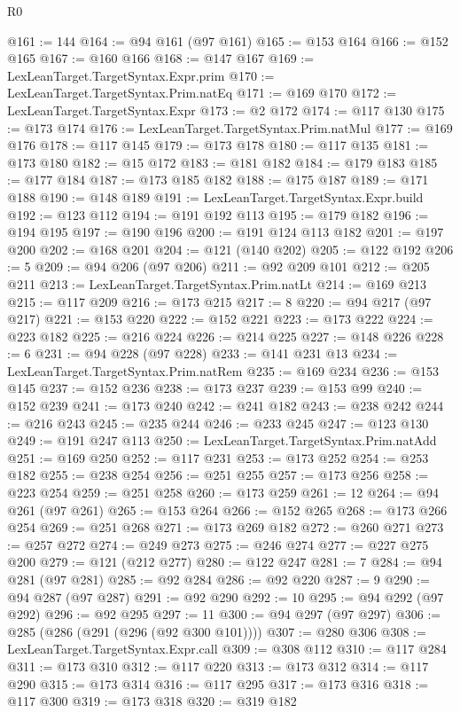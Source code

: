 \begin{lexlean}{R0}
\begin{coremodule}
@161 := 144
@164 := @94 @161 (@97 @161)
@165 := @153 @164
@166 := @152 @165
@167 := @160 @166
@168 := @147 @167
@169 := LexLeanTarget.TargetSyntax.Expr.prim
@170 := LexLeanTarget.TargetSyntax.Prim.natEq
@171 := @169 @170
@172 := LexLeanTarget.TargetSyntax.Expr
@173 := @2 @172
@174 := @117 @130
@175 := @173 @174
@176 := LexLeanTarget.TargetSyntax.Prim.natMul
@177 := @169 @176
@178 := @117 @145
@179 := @173 @178
@180 := @117 @135
@181 := @173 @180
@182 := @15 @172
@183 := @181 @182
@184 := @179 @183
@185 := @177 @184
@187 := @173 @185 @182
@188 := @175 @187
@189 := @171 @188
@190 := @148 @189
@191 := LexLeanTarget.TargetSyntax.Expr.build
@192 := @123 @112
@194 := @191 @192 @113
@195 := @179 @182
@196 := @194 @195
@197 := @190 @196
@200 := @191 @124 @113 @182
@201 := @197 @200
@202 := @168 @201
@204 := @121 (@140 @202)
@205 := @122 @192
@206 := 5
@209 := @94 @206 (@97 @206)
@211 := @92 @209 @101
@212 := @205 @211
@213 := LexLeanTarget.TargetSyntax.Prim.natLt
@214 := @169 @213
@215 := @117 @209
@216 := @173 @215
@217 := 8
@220 := @94 @217 (@97 @217)
@221 := @153 @220
@222 := @152 @221
@223 := @173 @222
@224 := @223 @182
@225 := @216 @224
@226 := @214 @225
@227 := @148 @226
@228 := 6
@231 := @94 @228 (@97 @228)
@233 := @141 @231 @13
@234 := LexLeanTarget.TargetSyntax.Prim.natRem
@235 := @169 @234
@236 := @153 @145
@237 := @152 @236
@238 := @173 @237
@239 := @153 @99
@240 := @152 @239
@241 := @173 @240
@242 := @241 @182
@243 := @238 @242
@244 := @216 @243
@245 := @235 @244
@246 := @233 @245
@247 := @123 @130
@249 := @191 @247 @113
@250 := LexLeanTarget.TargetSyntax.Prim.natAdd
@251 := @169 @250
@252 := @117 @231
@253 := @173 @252
@254 := @253 @182
@255 := @238 @254
@256 := @251 @255
@257 := @173 @256
@258 := @223 @254
@259 := @251 @258
@260 := @173 @259
@261 := 12
@264 := @94 @261 (@97 @261)
@265 := @153 @264
@266 := @152 @265
@268 := @173 @266 @254
@269 := @251 @268
@271 := @173 @269 @182
@272 := @260 @271
@273 := @257 @272
@274 := @249 @273
@275 := @246 @274
@277 := @227 @275 @200
@279 := @121 (@212 @277)
@280 := @122 @247
@281 := 7
@284 := @94 @281 (@97 @281)
@285 := @92 @284
@286 := @92 @220
@287 := 9
@290 := @94 @287 (@97 @287)
@291 := @92 @290
@292 := 10
@295 := @94 @292 (@97 @292)
@296 := @92 @295
@297 := 11
@300 := @94 @297 (@97 @297)
@306 := @285 (@286 (@291 (@296 (@92 @300 @101))))
@307 := @280 @306
@308 := LexLeanTarget.TargetSyntax.Expr.call
@309 := @308 @112
@310 := @117 @284
@311 := @173 @310
@312 := @117 @220
@313 := @173 @312
@314 := @117 @290
@315 := @173 @314
@316 := @117 @295
@317 := @173 @316
@318 := @117 @300
@319 := @173 @318
@320 := @319 @182

\end{coremodule}
\end{lexlean}
